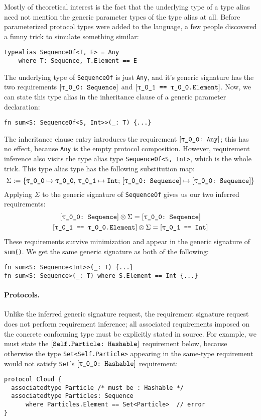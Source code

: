 \documentclass[../generics]{subfiles}
\begin{document}
Mostly of theoretical interest is the fact that the underlying type of a type alias need not mention the generic parameter types of the type alias at all. Before parameterized protocol types were added to the language, a few people discovered a funny trick to simulate something similar:
\begin{Verbatim}
typealias SequenceOf<T, E> = Any
    where T: Sequence, T.Element == E
\end{Verbatim}
The underlying type of \texttt{SequenceOf} is just \texttt{Any}, and it's generic signature has the two requirements $\rTSequence$ and $\SameReq{\rU}{\rT.Element}$. Now, we can state this type alias in the inheritance clause of a generic parameter declaration:
\begin{Verbatim}
fn sum<S: SequenceOf<S, Int>>(_: T) {...}
\end{Verbatim}
The inheritance clause entry introduces the requirement $\ConfReq{\rT}{Any}$; this has no effect, because \texttt{Any} is the empty protocol composition. However, requirement inference also visits the type alias type \texttt{SequenceOf<S, Int>}, which is the whole trick. This type alias type has the following substitution map:
\[
\Sigma := \SubstMapC{
\SubstType{\rT}{\rT},\,\SubstType{\rU}{Int}
}{\SubstConf{\rT}{\rT}{Sequence}}
\]
Applying $\Sigma$ to the generic signature of \texttt{SequenceOf} gives us our two inferred requirements:
\begin{gather*}
\rTSequence\otimes\Sigma = \rTSequence\\
\SameReq{\rU}{\rT.Element}\otimes\Sigma = \SameReq{\rU}{Int}
\end{gather*}
These requirements survive minimization and appear in the generic signature of \texttt{sum()}. We get the same generic signature as both of the following: 
\begin{Verbatim}
fn sum<S: Sequence<Int>>(_: T) {...}
fn sum<S: Sequence>(_: T) where S.Element == Int {...}
\end{Verbatim}

\paragraph{Protocols.}
Unlike the inferred generic signature request, the requirement signature request does not perform requirement inference; all associated requirements imposed on the concrete conforming type must be explicitly stated in source. For example, we must state the $[\texttt{Self.Particle:~Hashable}]$ requirement below, because otherwise the type \texttt{Set<Self.Particle>} appearing in the same-type requirement would not satisfy \texttt{Set}'s $\ConfReq{\rT}{Hashable}$ requirement:
\begin{Verbatim}
protocol Cloud {
  associatedtype Particle /* must be : Hashable */
  associatedtype Particles: Sequence
      where Particles.Element == Set<Particle>  // error
}
\end{Verbatim}
\end{document}
